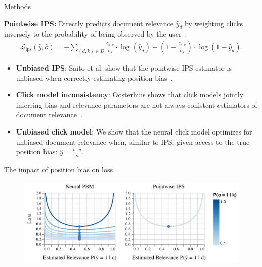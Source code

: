 \documentclass[final]{beamer}
\newlength{\onecolwid}
\begin{document}
\begin{frame}[t]
\begin{columns}[t]
\begin{column}{\onecolwid}
\begin{block}{Methods}
		\vspace{1ex}
		
		\textbf{Pointwise IPS:} Directly predicts document relevance $\hat{y}_d$ by weighting clicks inversely to the probability of being observed by the user~\cite{Saito2020PointwiseIPS}:
		\vspace{1ex}
		\begin{equation*}
			\begin{split}
			\mathcal{L}_{\text{ips}}(\hat{y}, \hat{o}) = - \sum_{(d,k) \in D} \frac{c_{d,k}}{\hat{o}_k} \cdot \log(\hat{y}_{d}) + (1 - \frac{c_{d,k}}{\hat{o}_k}) \cdot \log(1 - \hat{y}_{d}).
			\end{split}
		\end{equation*}

		\vspace{1ex}

		\begin{itemize}
			\item \textbf{Unbiased IPS}: Saito et al. show that the pointwise IPS estimator is unbiased when correctly estimating position bias~\cite{Saito2020PointwiseIPS}.
			\item \textbf{Click model inconsistency}: Oosterhuis shows that click models jointly inferring bias and relevance parameters are not always conistent estimators of document relevance~\cite{Oosterhuis2022ULTRLimits}.
			\item \textbf{Unbiased click model}: \alert{We show that the neural click model optimizes for unbiased document relevance when, similar to IPS, given access to the true position bias}: $\hat{y} = \frac{o \cdot y}{\hat{o}}$.
		\end{itemize}
	
	\end{block}

	\vspace{1ex}
	
	\begin{block}{The impact of position bias on loss}

		\begin{figure}[h]
			\includegraphics[width=1.\textwidth]{loss.pdf}
		\end{figure}
	

\end{block}
\end{column}
\end{columns}
\end{frame}
\end{document}
